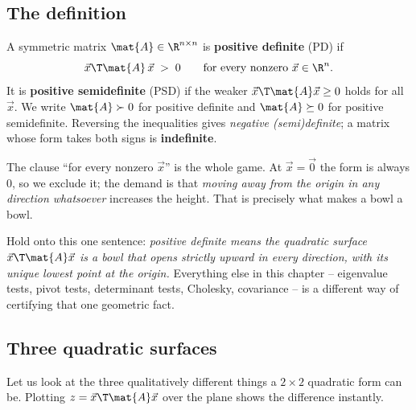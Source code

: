 \subsection{The definition}

\begin{definition}
\label{ch27:def-pd}
A symmetric matrix $\mat{A} \in \R^{n\times n}$ is \textbf{positive definite} (PD) if
\[
  \vec{x}\T \mat{A}\, \vec{x} \;>\; 0 \qquad \text{for every nonzero } \vec{x} \in \R^n.
\]
It is \textbf{positive semidefinite} (PSD) if the weaker $\vec{x}\T\mat{A}\vec{x} \geq 0$ holds for
all $\vec{x}$. We write $\mat{A} \succ 0$ for positive definite and $\mat{A} \succeq 0$ for positive
semidefinite. Reversing the inequalities gives \emph{negative (semi)definite}; a matrix whose form
takes both signs is \textbf{indefinite}.
\end{definition}

The clause ``for every nonzero $\vec{x}$'' is the whole game. At $\vec{x} = \vec{0}$ the form is
always $0$, so we exclude it; the demand is that \emph{moving away from the origin in any direction
whatsoever} increases the height. That is precisely what makes a bowl a bowl.

\begin{focusbox}
Hold onto this one sentence: \emph{positive definite means the quadratic surface
$\vec{x}\T\mat{A}\vec{x}$ is a bowl that opens strictly upward in every direction, with its unique
lowest point at the origin.} Everything else in this chapter -- eigenvalue tests, pivot tests,
determinant tests, Cholesky, covariance -- is a different way of certifying that one geometric fact.
\end{focusbox}

\subsection{Three quadratic surfaces}

Let us look at the three qualitatively different things a $2\times 2$ quadratic form can be. Plotting
$z = \vec{x}\T\mat{A}\vec{x}$ over the plane shows the difference instantly.

